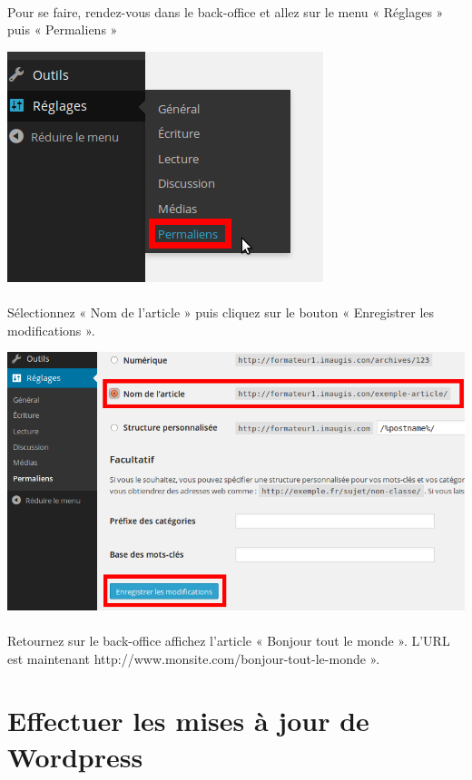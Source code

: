 \documentclass[10pt,a4paper]{article}
\begin{document}
\paragraph{}Pour se faire, rendez-vous dans le back-office et allez sur le menu « Réglages » puis « Permaliens »
\begin{center}
\includegraphics[scale=0.5]{img/0048.png}
\end{center}
\paragraph{}Sélectionnez « Nom de l'article » puis cliquez sur le bouton « Enregistrer les modifications ».
\begin{center}
\includegraphics[scale=0.4]{img/0049.png}
\end{center}
\paragraph{}Retournez sur le back-office affichez l'article « Bonjour tout le monde ». L'URL est maintenant http://www.monsite.com/bonjour-tout-le-monde ».
\newpage

\section{Effectuer les mises à jour de Wordpress}
\end{document}
